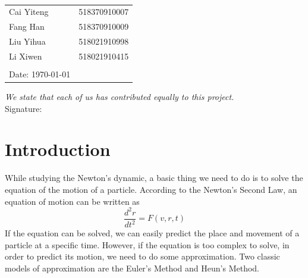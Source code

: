 \documentclass[12pt]{report}
\begin{document}
\setlength{\parindent}{1em}
\vspace*{0.25cm}
\hrulefill
\thispagestyle{empty}
\begin{center}
    \begin{large}
    \end{large}
    \hrulefill
    \vspace*{5cm}\\
    \begin{large}
    \end{large}
\end{center}
\vfill
\begin{large}
\end{large}
\begin{table}[h!]
    \flushleft
    \begin{tabular}{ll}
        Cai Yiteng \hspace*{3em}&518370910007\hspace*{3em}\\
        Fang Han \hspace*{3em}&518370910009\hspace*{3em}\\
        Liu Yihua \hspace*{3em}&518021910998\hspace*{3em}\\
        Li Xiwen \hspace*{3em}&518021910415\hspace*{3em}\\
        \\
        Date: \today
    \end{tabular}
\end{table}

\textit{We state that each of us has contributed equally to this project.}\\

Signature:\underline{\makebox[25em]{                                         }}
\hfill
\clearpage
\renewcommand{\thesection}{\arabic{section}}
\section{Introduction}
While studying the Newton's dynamic, a basic thing we need to do is to solve the equation of the motion of a particle. According to the Newton's Second Law, an equation of motion can be written as
\begin{equation}
    \frac{d^2r}{dt^2}=F(v,r,t)
\end{equation}
If the equation can be solved, we can easily predict the place and movement of a particle at a specific time. However, if the equation is too complex to solve, in order to predict its motion, we need to do some approximation. Two classic models of approximation are the Euler's Method and Heun's Method.
\end{document}
